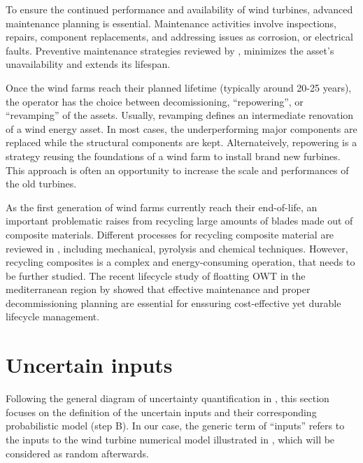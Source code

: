 To ensure the continued performance and availability of wind turbines, advanced maintenance planning is essential. 
Maintenance activities involve inspections, repairs, component replacements, and addressing issues as corrosion, or electrical faults. 
Preventive maintenance strategies reviewed by \citet{ren_2021_owt_maintenance}, minimizes the asset's unavailability and extends its lifespan. 

Once the wind farms reach their planned lifetime (typically around 20-25 years), the operator has the choice between decomissioning, ``repowering'', or ``revamping'' of the assets. 
Usually, revamping defines an intermediate renovation of a wind energy asset. 
In most cases, the underperforming major components are replaced while the structural components are kept. 
Alternateively, repowering is a strategy reusing the foundations of a wind farm to install brand new furbines. 
This approach is often an opportunity to increase the scale and performances of the old turbines. 

As the first generation of wind farms currently reach their end-of-life, an important problematic raises from recycling large amounts of blades made out of composite materials. 
Different processes for recycling composite material are reviewed in \citet{jensen_2018_blade_recycling}, including mechanical, pyrolysis and chemical techniques. 
However, recycling composites is a complex and energy-consuming operation, that needs to be further studied. 
The recent lifecycle study of floatting OWT in the mediterranean region by \citet {pulselli_2022_FOWT_lifecycle} showed that effective maintenance and 
proper decommissioning planning are essential for enssuring cost-effective yet durable lifecycle management.  




\section{Uncertain inputs} \label{sec:owt_uncertainties}

Following the general diagram of uncertainty quantification in , this section focuses on the definition of the uncertain inputs and their corresponding probabilistic model (step B). 
In our case, the generic term of ``inputs'' refers to the inputs to the wind turbine numerical model illustrated in , which will be considered as random afterwards. 

